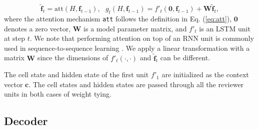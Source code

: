 \documentclass{article}
\begin{document}
\[
\tilde{\mathbf{f}}_t = \mbox{att}(H, \mathbf{f}_{t - 1}), ~~~ g_t(H, \mathbf{f}_{t - 1}) = f'_t(\mathbf{0}, \mathbf{f}_{t - 1}) + \mathbf{W} \tilde{\mathbf{f}}_t,
\]
where the attention mechanism \texttt{att} follows the definition in Eq. (\ref{eq:att}), $\mathbf{0}$ denotes a zero vector, $\mathbf{W}$ is a model parameter matrix, and $f'_t$ is an LSTM unit at step $t$. We note that performing attention on top of an RNN unit is commonly used in sequence-to-sequence learning \cite{bahdanau2014neural,luong2015effective,rush2015neural}. We apply a linear transformation with a matrix $\mathbf{W}$ since the dimensions of $f'_t(\cdot, \cdot)$ and $\tilde{\mathbf{f}}_t$ can be different.


The cell state and hidden state of the first unit $f'_1$ are initialized as the context vector $\mathbf{c}$. The cell states and hidden states are passed through all the reviewer units in both cases of weight tying.

\subsection{Decoder}
\end{document}
